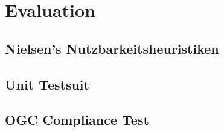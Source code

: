 \newpage
\restoregeometry
\section{Evaluation}
\subsection{Nielsen's Nutzbarkeitsheuristiken}
\subsection{Unit Testsuit}
\subsection{OGC Compliance Test}